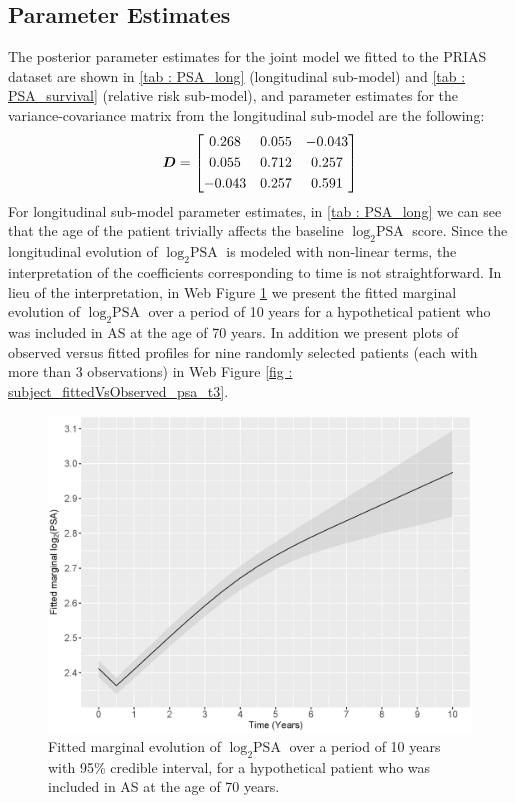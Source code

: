 \subsection{Parameter Estimates}
\label{subsec : param_estimates}
The posterior parameter estimates for the joint model we fitted to the PRIAS dataset are shown in \ref{tab : PSA_long} (longitudinal sub-model) and \ref{tab : PSA_survival} (relative risk sub-model), and parameter estimates for the variance-covariance matrix from the longitudinal sub-model are the following:
\begin{equation*}
\boldsymbol{D} = \begin{bmatrix}
       0.268 & 0.055 & -0.043 \\[0.3em]
       0.055 & 0.712 & 0.257 \\[0.3em]
       -0.043 & 0.257 & 0.591
     \end{bmatrix}
\end{equation*} 
For longitudinal sub-model parameter estimates, in \ref{tab : PSA_long} we can see that the age of the patient trivially affects the baseline $\log_2 \mbox{PSA}$ score. Since the longitudinal evolution of $\log_2 \mbox{PSA}$ is modeled with non-linear terms, the interpretation of the coefficients corresponding to time is not straightforward. In lieu of the interpretation, in Web Figure \ref{fig : fitted_trend_psa} we present the fitted marginal evolution of $\log_2 \mbox{PSA}$ over a period of 10 years for a hypothetical patient who was included in AS at the age of 70 years. In addition we present plots of observed versus fitted profiles for nine randomly selected patients (each with more than 3 observations) in Web Figure \ref{fig : subject_fittedVsObserved_psa_t3}.

\begin{figure}[!htb]
\centerline{\includegraphics[width=\columnwidth]{images/model_fit/marginal_fitted_psa_t3.eps}}
\caption{Fitted marginal evolution of $\log_2 \mbox{PSA}$ over a period of 10 years with 95\% credible interval, for a hypothetical patient who was included in AS at the age of 70 years.}
\label{fig : fitted_trend_psa}
\end{figure}

